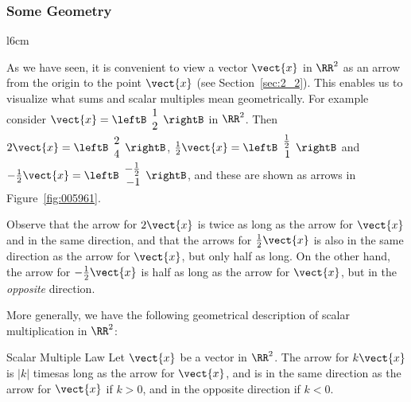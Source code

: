 \subsubsection*{Some Geometry}
\vspace{-1em}

\begin{wrapfigure}[10]{l}{6cm} 
\centering

\caption{\label{fig:005961}}
\end{wrapfigure}

As we have seen, it is convenient to view a vector $\vect{x}$ in $\RR^2$ as an arrow from the origin to the point $\vect{x}$ (see Section~\ref{sec:2_2}). This enables us to visualize what sums and scalar multiples mean geometrically. For example consider $\vect{x} = \leftB \begin{array}{rr}
1 \\
2
\end{array} \rightB$
 in $\RR^2$. Then $2\vect{x} = \leftB \begin{array}{rr}
 2 \\
 4
 \end{array} \rightB$, $\frac{1}{2}\vect{x} = \leftB \begin{array}{rr}
 \frac{1}{2} \\
 1
 \end{array} \rightB$
 and $-\frac{1}{2}\vect{x} = \leftB \begin{array}{rr}
 -\frac{1}{2} \\
 -1
 \end{array} \rightB$, and these are shown as arrows in Figure~\ref{fig:005961}. 

Observe that the arrow for $2\vect{x}$ is twice as long as the arrow for $\vect{x}$ and in the same direction, and that the arrows for $\frac{1}{2}\vect{x}$ is also in the same direction as the arrow for $\vect{x}$, but only half as long. On the other hand, the arrow for $-\frac{1}{2}\vect{x}$ is half as long as the arrow for $\vect{x}$, but in the \textit{opposite} direction.

\medskip

More generally, we have the following geometrical description of scalar multiplication in $\RR^2$:

\begin{theorem*}[label=thm:scalarmultiplelaw]{Scalar Multiple Law}
Let $\vect{x}$ be a vector in $\RR^2$. The arrow for $k\vect{x}$ is $|k|$ times\footnotemark as long as the arrow for $\vect{x}$, and is in the same direction as the arrow for $\vect{x}$ if $k > 0$, and in the opposite direction if $k < 0$.
\end{theorem*}

